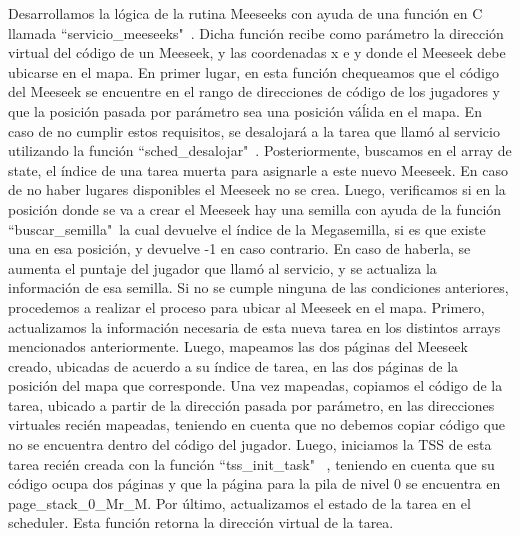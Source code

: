\documentclass[a4paper]{article}
\begin{document}
Desarrollamos la lógica de la rutina Meeseeks con ayuda de una función en C llamada ``servicio_meeseeks"\ . Dicha función recibe como parámetro la dirección virtual del código de un Meeseek, y las coordenadas x e y donde el Meeseek debe ubicarse en el mapa. En primer lugar, en esta función chequeamos que el código del Meeseek se encuentre en el rango de direcciones de código de los jugadores y que la posición pasada por parámetro sea una posición váĺida en el mapa. En caso de no cumplir estos requisitos, se desalojará a la tarea que llamó al servicio utilizando la función ``sched_desalojar"\ . Posteriormente, buscamos en el array de state, el índice de una tarea muerta para asignarle a este nuevo Meeseek. En caso de no haber lugares disponibles el Meeseek no se crea. Luego, verificamos si en la posición donde se va a crear el Meeseek hay una semilla con ayuda de la función ``buscar_semilla"\, la cual devuelve el índice de la Megasemilla, si es que existe una en esa posición, y devuelve -1 en caso contrario. En caso de haberla, se aumenta el puntaje del jugador que llamó al servicio, y se actualiza la información de esa semilla. Si no se cumple ninguna de las condiciones anteriores, procedemos a realizar el proceso para ubicar al Meeseek en el mapa. Primero, actualizamos la información necesaria de esta nueva tarea en los distintos arrays mencionados anteriormente. Luego, mapeamos las dos páginas del Meeseek creado, ubicadas de acuerdo a su índice de tarea, en las dos páginas de la posición del mapa que corresponde. Una vez mapeadas, copiamos el código de la tarea, ubicado a partir de la dirección pasada por parámetro, en las direcciones virtuales recién mapeadas, teniendo en cuenta que no debemos copiar código que no se encuentra dentro del código del jugador. Luego, iniciamos la TSS de esta tarea recién creada con la función ``tss_init_task" \ , teniendo en cuenta que su código ocupa dos páginas y que la página para la pila de nivel 0 se encuentra en page_stack_0_Mr_M. Por último, actualizamos el estado de la tarea en el scheduler. Esta función retorna la dirección virtual de la tarea.
\justify
\end{document}
